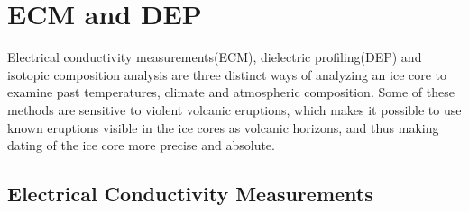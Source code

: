 \documentclass[../../CompleteThesis/Complete_1stDraft.tex]{subfiles}
\begin{document}
\section[ECM and DEP][ECM and DEP]{ECM and DEP}
Electrical conductivity measurements(ECM), dielectric profiling(DEP) and isotopic composition analysis are three distinct ways of analyzing an ice core to examine past temperatures, climate and atmospheric composition. Some of these methods are sensitive to violent volcanic eruptions, which makes it possible to use known eruptions visible in the ice cores as volcanic horizons, and thus making dating of the ice core more precise and absolute.
\subsection[ECM][ECM]{Electrical Conductivity Measurements}
\end{document}
